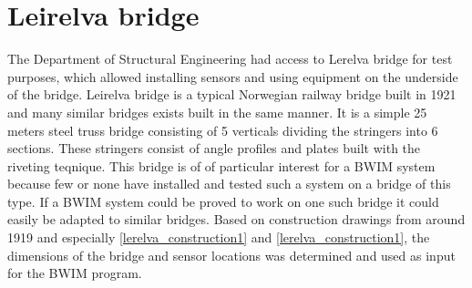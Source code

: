 \section{Leirelva bridge}
The Department of Structural Engineering had access to Lerelva bridge for test purposes, which allowed installing sensors and using equipment on the underside of the bridge.
Leirelva bridge is a typical Norwegian railway bridge built in 1921 and many similar bridges exists built in the same manner. It is a simple 25 meters steel truss bridge consisting of 5 verticals dividing the stringers into 6 sections. These stringers consist of angle profiles and plates built with the riveting teqnique.
This bridge is of of particular interest for a BWIM system because few or none have installed and tested such a system on a bridge of this type. If a BWIM system could be proved to work on one such bridge it could easily be adapted to similar bridges.
Based on construction drawings from around 1919 and especially \ref{lerelva_construction1} and \ref{lerelva_construction1}, the dimensions of the bridge and sensor locations was determined and used as input for the BWIM program.
